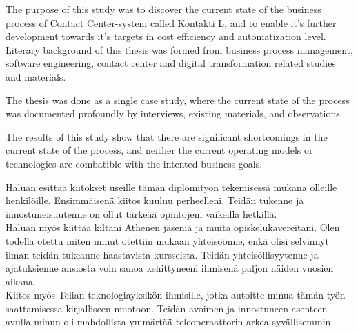 \documentclass[finnish,12pt,a4paper,pdftex]{article}
\begin{document}
\newpage
%
\begin{abstractpage}[english]
The purpose of this study was to discover the current state of the business process of Contact Center-system called Kontakti L, and to enable it's further development towards it's targets in cost efficiency and automatization level. Literary background of this thesis was formed from business process management, software engineering, contact center and digital transformation related studies and materials. 

The thesis was done as a single case study, where the current state of the process was documented profoundly by interviews, existing materials, and observations. 

The results of this study show that there are significant shortcomings in the current state of the process, and neither the current operating models or technologies are combatible with the intented business goals. 
\end{abstractpage}

Haluan esittää kiitokset useille tämän diplomityön tekemisessä mukana olleille henkilöille. Ensimmäisenä kiitos kuuluu perheelleni. Teidän tukenne ja innostuneisuutenne on ollut tärkeää opintojeni vaikeilla hetkillä. \\

\noindent Haluan myös kiittää kiltani Athenen jäseniä ja muita opiskelukavereitani. Olen todella otettu miten minut otettiin mukaan yhteisöönne, enkä olisi selvinnyt ilman teidän tukeanne haastavista kursseista. Teidän yhteisöllisyytenne ja ajatuksienne ansiosta voin sanoa kehittyneeni ihmisenä paljon näiden vuosien aikana. \\

\noindent Kiitos myös Telian teknologiayksikön ihmisille, jotka autoitte minua tämän työn saattamisessa kirjalliseen muotoon. Teidän avoimen ja innostuneen asenteen avulla minun oli mahdollista ymmärtää teleoperaattorin arkea syvällisemmin.\\
\end{document}
